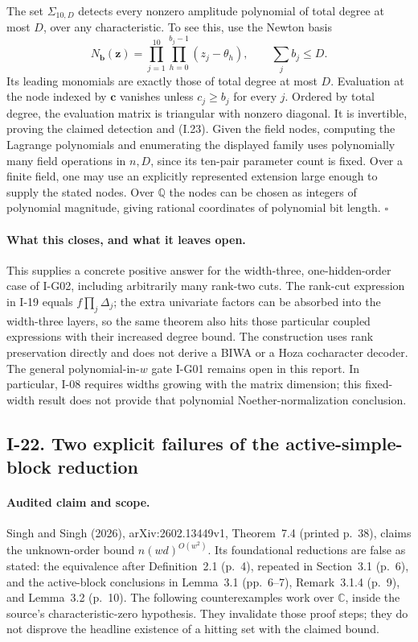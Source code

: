 \documentclass[11pt,a4paper]{article}
\theoremstyle{definition}\newtheorem{definition}{Definition}
\begin{document}
The set $\Sigma_{10,D}$ detects every nonzero amplitude polynomial
of total degree at most $D$, over any characteristic.  To see this,
use the Newton basis
\[
 N_{\mathbf b}(\mathbf z)
  =\prod_{j=1}^{10}\prod_{h=0}^{b_j-1}(z_j-\theta_h),
 \qquad \sum_jb_j\le D.
\]
Its leading monomials are exactly those of total degree at most
$D$.  Evaluation at the node indexed by $\mathbf c$ vanishes
unless $c_j\ge b_j$ for every $j$.  Ordered by total degree,
the evaluation matrix is triangular with nonzero diagonal.
It is invertible, proving the claimed detection and (I.23).
Given the field nodes, computing the Lagrange polynomials and
enumerating the displayed family uses polynomially many field
operations in $n,D$, since its ten-pair parameter count is fixed.
Over a finite field, one may use an explicitly represented
extension large enough to supply the stated nodes.  Over
$\mathbb Q$ the nodes can be chosen as integers of polynomial
magnitude, giving rational coordinates of polynomial bit length.
\hfill$\square$

\paragraph{What this closes, and what it leaves open.}
This supplies a concrete positive answer for the width-three,
one-hidden-order case of I-G02, including arbitrarily many
rank-two cuts.  The rank-cut expression in I-19 equals
$f\prod_j\Delta_j$; the extra univariate factors can be absorbed
into the width-three layers, so the same theorem also hits those
particular coupled expressions with their increased degree bound.
The construction uses rank preservation directly and does not
derive a BIWA or a Hoza cocharacter decoder.
The general polynomial-in-$w$ gate I-G01 remains open in this
report.  In particular, I-08 requires widths growing with the
matrix dimension; this fixed-width result does not provide that
polynomial Noether-normalization conclusion.


\subsection{I-22. Two explicit failures of the active-simple-block reduction}
\label{I-22}

\paragraph{Audited claim and scope.}
Singh and Singh (2026), arXiv:2602.13449v1, Theorem~7.4
(printed p.~38), claims the unknown-order bound
$n(wd)^{O(w^2)}$.  Its foundational reductions are false as stated:
the equivalence after Definition~2.1 (p.~4), repeated in
Section~3.1 (p.~6), and the active-block conclusions in
Lemma~3.1 (pp.~6--7), Remark~3.1.4 (p.~9), and Lemma~3.2
(p.~10).  The following counterexamples work over $\mathbb C$,
inside the source's characteristic-zero hypothesis.  They
invalidate those proof steps; they do not disprove the headline
existence of a hitting set with the claimed bound.
\end{document}
